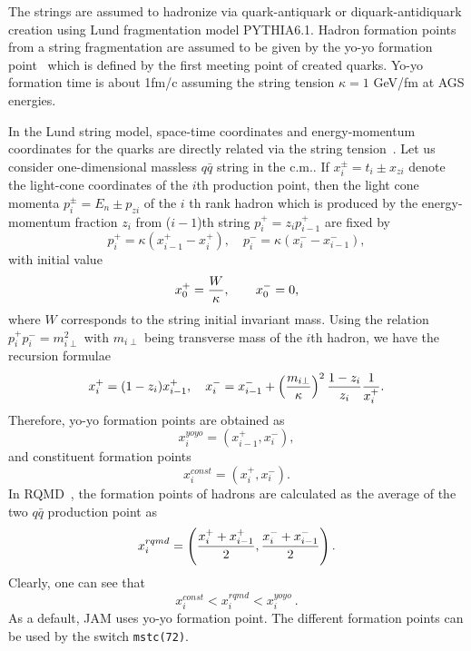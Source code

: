 \documentclass[]{article}
\newcommand{\ttt}[1]{{\tt#1}}
\begin{document}
The strings are assumed to hadronize via quark-antiquark 
or diquark-antidiquark %
creation using Lund fragmentation model PYTHIA6.1\cite{pythia}.
Hadron formation points from a string fragmentation
are assumed to be given by
  the yo-yo formation point~\cite{bialas} which is defined by the 
  first meeting point of created quarks.
Yo-yo formation time is about 1fm/c assuming the string
tension $\kappa=1$ GeV/fm at AGS energies.

In the Lund string model, space-time coordinates and energy-momentum
coordinates for the quarks are directly related
 via the string tension~\cite{lund,lund2}.
Let us consider one-dimensional massless $q\bar q$ string in the c.m..
If $x_i^{\pm}=t_i\pm x_{zi}$ denote the light-cone coordinates of the 
$i$th production point, then the light cone momenta
$p_i^{\pm}=E_n\pm p_{zi}$ of the $i$ th rank hadron
which is produced by the energy-momentum fraction $z_i$
from ($i-1$)th string $  p^+_i = z_i p^+_{i-1}$
 are fixed by
\begin{equation}
p_i^+ = \kappa (x_{i-1}^+ - x_i^+),\quad
p_i^- = \kappa (x_i^- - x_{i-1}^-),
\end{equation}
with initial value
\begin{equation}
  x^+_0 = {W\over \kappa},\qquad x^-_0=0,
\end{equation}
where $W$ corresponds to the string initial invariant mass.
Using the relation $p_i^+p_i^-=m_{i\perp}^2$ with
$m_{i\perp}$ being transverse mass of the $i$th hadron,
we have the recursion formulae~\cite{lund}
\begin{equation}
  x_i^+ = (1-z_i)x^+_{i-1}, \quad
  x_i^- = x^-_{i-1} + \left({m_{i\perp}\over \kappa}\right)^2
                   {1-z_i\over z_i}{1\over x^+_i}.
\end{equation}
Therefore, yo-yo formation points are obtained as
\begin{equation}
    x_i^{yoyo}=(x_{i-1}^+,x_i^-), \label{eq:yoyo}
\end{equation}
and constituent formation points
\begin{equation}
    x_i^{const}=(x_i^+,x_i^-). \label{eq:const}
\end{equation}
In RQMD~\cite{rqmd2}, the formation points of hadrons are calculated
as the average of the two $q\bar q$ production point as
\begin{equation}
    x_i^{rqmd}
  =\left({x_i^+ + x_{i-1}^+\over 2},{x_i^-+x_{i-1}^-\over 2}\right).
  \label{eq:rqmd}
\end{equation}
Clearly, one can see that
\begin{equation}
    x_i^{const} < x_i^{rqmd} < x_i^{yoyo} ~.
\end{equation}
As a default, JAM uses yo-yo formation point.
The different formation points can be used by the switch \ttt{mstc(72)}.
\end{document}

